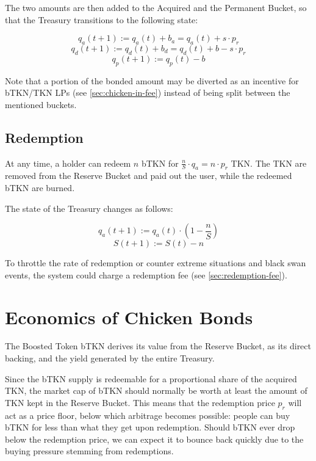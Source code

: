 \documentclass{article}
\begin{document}
The two amounts are then added to the Acquired and the Permanent Bucket, so that the Treasury transitions to the following state:

\begin{equation}
  \label{eq:chicken-in-qa}
    q_a(t+1) := q_a(t) + b_a = q_a(t) + s \cdot p_r
\end{equation}
\begin{equation}
  \label{eq:chicken-in-qd}
    q_d(t+1) := q_d(t) + b_d = q_d(t) + b - s \cdot p_r
\end{equation}
\begin{equation}
  \label{eq:chicken-in-qp}
    q_p(t+1) := q_p(t) - b
\end{equation}

Note that a portion of the bonded amount may be diverted as an incentive for bTKN/TKN LPs (see \ref{sec:chicken-in-fee}) instead of being split between the mentioned buckets.

\subsection{Redemption}
\label{sec:redemption}
At any time, a holder can redeem $n$ bTKN for $\frac{n}{S}\cdot q_a = n \cdot p_r$ TKN.
The TKN are removed from the Reserve Bucket and paid out the user, while the redeemed bTKN are burned.

The state of the Treasury changes as follows: 

\begin{equation}
  \label{eq:redemption-qa}
    q_a(t+1) := q_a(t) \cdot (1 - \frac{n}{S})
\end{equation}
\begin{equation}
  \label{eq:redemption-S}
    S(t+1) := S(t) - n
\end{equation}

To throttle the rate of redemption or counter extreme situations and black swan events, the system could charge a redemption fee (see \ref{sec:redemption-fee}).

\section{Economics of Chicken Bonds}
 \label{sec:economics}
The Boosted Token bTKN derives its value from the Reserve Bucket, as its direct backing, and the yield generated by the entire Treasury.

Since the bTKN supply is redeemable for a proportional share of the acquired TKN, the market cap of bTKN should normally be worth at least the amount of TKN kept in the Reserve Bucket. This means that the redemption price $p_r$ will act as a price floor, below which arbitrage becomes possible: people can buy bTKN for less than what they get upon redemption. Should bTKN ever drop below the redemption price, we can expect it to bounce back quickly due to the buying pressure stemming from redemptions.
\end{document}
